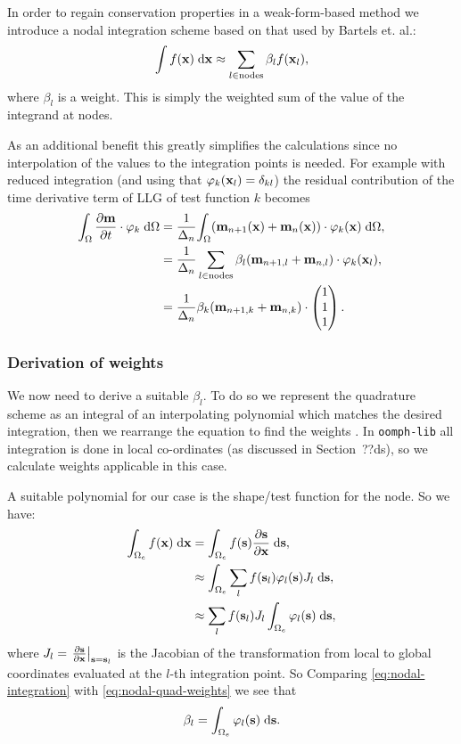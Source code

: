 In order to regain conservation properties in a weak-form-based method we introduce a nodal integration scheme based on that used by Bartels et. al.\cite{Bartels2006}:
\begin{equation}
  \label{eq:nodal-integration}
  \int f(\mathbf{x}) {\; \text{d}} \mathbf{x} \approx \sum_{l\in \text{nodes}} \beta_l f(\mathbf{x}_l),
\end{equation}
where $\beta_l$ is a weight.
This is simply the weighted sum of the value of the integrand at nodes.

As an additional benefit this greatly simplifies the calculations since no interpolation of the values to the integration points is needed.
For example with reduced integration (and using that $\varphi_k(\mathbf{x}_l) = \delta_{kl}$) the residual contribution of the time derivative term of LLG of test function $k$ becomes
\begin{equation}
  \begin{aligned}
    {\int_{\Omega} \frac{\partial \mathbf{m}}{\partial t}\cdot \mathbf{\varphi}_k {\; \text{d}}{\Omega}} &= \frac{1}{\Delta_{n}} {\int_{\Omega} (\mathbf{m}_{n+1}(\mathbf{x}) + \mathbf{m}_{n}(\mathbf{x})) \cdot \mathbf{\varphi}_k(\mathbf{x}) {\; \text{d}} {\Omega}}, \\
    & = \frac{1}{\Delta_{n}} \sum_{l\in \text{nodes}} \beta_l (\mathbf{m}_{n+1, l} + \mathbf{m}_{n, l}) \cdot \mathbf{\varphi}_k(\mathbf{x}_l), \\
    & = \frac{1}{\Delta_{n}} \beta_k (\mathbf{m}_{n+1, k} + \mathbf{m}_{n, k}) \cdot \begin{pmatrix} 1 \\ 1 \\ 1 \end{pmatrix}.
  \end{aligned}
\end{equation}


\subsubsection{Derivation of weights}

We now need to derive a suitable $\beta_l$.
To do so we represent the quadrature scheme as an integral of an interpolating polynomial which matches the desired integration, then we rearrange the equation to find the weights \cite[pg. 480]{Kincaid2002}.
In \texttt{oomph-lib} all integration is done in local co-ordinates (as discussed in Section~??ds), so we calculate weights applicable in this case.

A suitable polynomial for our case is the shape/test function for the node.
So we have:
\begin{equation}
\label{eq:nodal-quad-weights}
  \begin{aligned}
    \int_{\Omega_e} f(\mathbf{x}) {\; \text{d}} \mathbf{x} &= \int_{\Omega_e} f({\mathbf{s}}) \frac{\partial {\mathbf{s}}}{\partial \mathbf{x}} {\; \text{d}} {\mathbf{s}}, \\
    &\approx \int_{\Omega_e} \sum_l f({\mathbf{s}}_l) \varphi_l({\mathbf{s}}) J_l {\; \text{d}} {\mathbf{s}}, \\
    &\approx  \sum_l f({\mathbf{s}}_l) J_l \int_{\Omega_e} \varphi_l({\mathbf{s}})  {\; \text{d}} {\mathbf{s}},
  \end{aligned} 
\end{equation}
where $J_l =  {\left. \frac{\partial {\mathbf{s}}}{\partial \mathbf{x}} \right|}_{{\mathbf{s}}={\mathbf{s}}_l}$ is the Jacobian of the transformation from local to global coordinates evaluated at the $l$-th integration point.
So 
Comparing \eqref{eq:nodal-integration} with \eqref{eq:nodal-quad-weights} we see that
\begin{equation}
  \beta_l =  \int_{\Omega_e} \varphi_l({\mathbf{s}})  {\; \text{d}} {\mathbf{s}}.
\end{equation}

